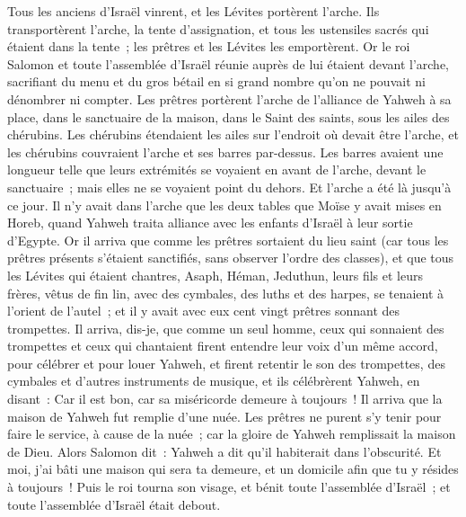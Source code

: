 \begin{multicols}{2}
Tous les anciens d'Israël vinrent, et les Lévites portèrent l'arche.
Ils transportèrent l'arche, la tente d'assignation, et tous les ustensiles sacrés qui étaient dans la tente~; les prêtres et les Lévites les emportèrent.
Or le roi Salomon et toute l'assemblée d'Israël réunie auprès de lui étaient devant l'arche, sacrifiant du menu et du gros bétail en si grand nombre qu'on ne pouvait ni dénombrer ni compter.
Les prêtres portèrent l'arche de l'alliance de Yahweh à sa place, dans le sanctuaire de la maison, dans le Saint des saints, sous les ailes des chérubins.
Les chérubins étendaient les ailes sur l'endroit où devait être l'arche, et les chérubins couvraient l'arche et ses barres par-dessus.
Les barres avaient une longueur telle que leurs extrémités se voyaient en avant de l'arche, devant le sanctuaire~; mais elles ne se voyaient point du dehors. Et l'arche a été là jusqu'à ce jour.
Il n'y avait dans l'arche que les deux tables que Moïse y avait mises en Horeb, quand Yahweh traita alliance avec les enfants d'Israël à leur sortie d'Egypte.
Or il arriva que comme les prêtres sortaient du lieu saint (car tous les prêtres présents s'étaient sanctifiés, sans observer l'ordre des classes),
et que tous les Lévites qui étaient chantres, Asaph, Héman, Jeduthun, leurs fils et leurs frères, vêtus de fin lin, avec des cymbales, des luths et des harpes, se tenaient à l'orient de l'autel~; et il y avait avec eux cent vingt prêtres sonnant des trompettes.
Il arriva, dis-je, que comme un seul homme, ceux qui sonnaient des trompettes et ceux qui chantaient firent entendre leur voix d'un même accord, pour célébrer et pour louer Yahweh, et firent retentir le son des trompettes, des cymbales et d'autres instruments de musique, et ils célébrèrent Yahweh, en disant~: Car il est bon, car sa miséricorde demeure à toujours~! Il arriva que la maison de Yahweh fut remplie d'une nuée.
Les prêtres ne purent s'y tenir pour faire le service, à cause de la nuée~; car la gloire de Yahweh remplissait la maison de Dieu.
\VerseOne{}Alors Salomon dit~: Yahweh a dit qu'il habiterait dans l'obscurité.
Et moi, j'ai bâti une maison qui sera ta demeure, et un domicile afin que tu y résides à toujours~!
Puis le roi tourna son visage, et bénit toute l'assemblée d'Israël~; et toute l'assemblée d'Israël était debout.

\end{multicols}
